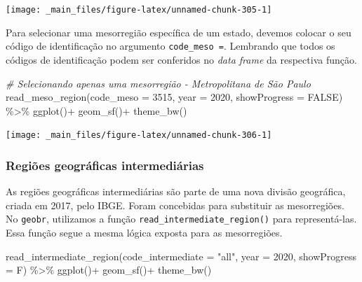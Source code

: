 \documentclass[
  brazilian,
]{book}
\newenvironment{Shaded}{\begin{snugshade}}{\end{snugshade}}
\newcommand{\AttributeTok}[1]{\textcolor[rgb]{0.77,0.63,0.00}{#1}}
\newcommand{\CommentTok}[1]{\textcolor[rgb]{0.56,0.35,0.01}{\textit{#1}}}
\newcommand{\ConstantTok}[1]{\textcolor[rgb]{0.00,0.00,0.00}{#1}}
\newcommand{\DecValTok}[1]{\textcolor[rgb]{0.00,0.00,0.81}{#1}}
\newcommand{\FunctionTok}[1]{\textcolor[rgb]{0.00,0.00,0.00}{#1}}
\newcommand{\NormalTok}[1]{#1}
\newcommand{\SpecialCharTok}[1]{\textcolor[rgb]{0.00,0.00,0.00}{#1}}
\newcommand{\StringTok}[1]{\textcolor[rgb]{0.31,0.60,0.02}{#1}}
\begin{document}
\begin{center}\texttt{[image: \_main\_files/figure-latex/unnamed-chunk-305-1]} \end{center}

Para selecionar uma mesorregião específica de um estado, devemos colocar o seu código de identificação no argumento \texttt{code\_meso\ =}. Lembrando que todos os códigos de identificação podem ser conferidos no \emph{data frame} da respectiva função.

\begin{Shaded}
\begin{Highlighting}[]
\CommentTok{\# Selecionando apenas uma mesorregião {-} Metropolitana de São Paulo}
\FunctionTok{read\_meso\_region}\NormalTok{(}\AttributeTok{code\_meso =} \DecValTok{3515}\NormalTok{,}
                 \AttributeTok{year =} \DecValTok{2020}\NormalTok{,}
                 \AttributeTok{showProgress =} \ConstantTok{FALSE}\NormalTok{) }\SpecialCharTok{\%\textgreater{}\%} 
  \FunctionTok{ggplot}\NormalTok{()}\SpecialCharTok{+}
  \FunctionTok{geom\_sf}\NormalTok{()}\SpecialCharTok{+}
  \FunctionTok{theme\_bw}\NormalTok{()}
\end{Highlighting}
\end{Shaded}

\begin{center}\texttt{[image: \_main\_files/figure-latex/unnamed-chunk-306-1]} \end{center}

\hypertarget{regiuxf5es-geogruxe1ficas-intermediuxe1rias}{%
\subsubsection{Regiões geográficas intermediárias}\label{regiuxf5es-geogruxe1ficas-intermediuxe1rias}}

As regiões geográficas intermediárias são parte de uma nova divisão geográfica, criada em 2017, pelo IBGE. Foram concebidas para substituir as mesorregiões. No \texttt{geobr}, utilizamos a função \texttt{read\_intermediate\_region()} para representá-las. Essa função segue a mesma lógica exposta para as mesorregiões.

\begin{Shaded}
\begin{Highlighting}[]
\FunctionTok{read\_intermediate\_region}\NormalTok{(}\AttributeTok{code\_intermediate =} \StringTok{"all"}\NormalTok{,}
                         \AttributeTok{year =} \DecValTok{2020}\NormalTok{,}
                         \AttributeTok{showProgress =}\NormalTok{ F) }\SpecialCharTok{\%\textgreater{}\%} 
  \FunctionTok{ggplot}\NormalTok{()}\SpecialCharTok{+}
  \FunctionTok{geom\_sf}\NormalTok{()}\SpecialCharTok{+}
  \FunctionTok{theme\_bw}\NormalTok{()}
\end{Highlighting}
\end{Shaded}
\end{document}
